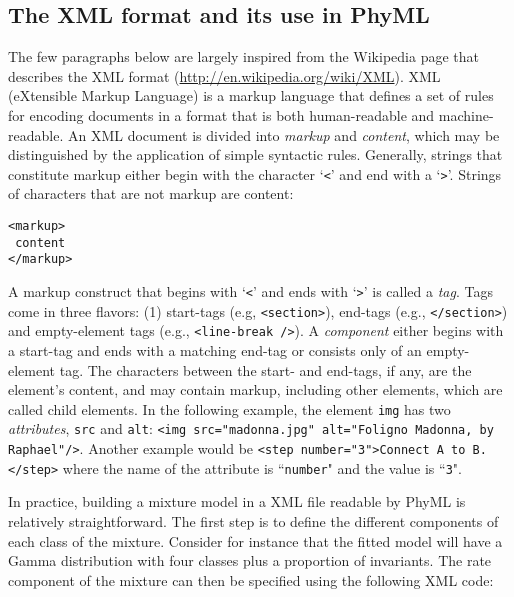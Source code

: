 \documentclass[a4paper,12pt]{article}
\newcommand{\x}[1]{\texttt{#1}}
\begin{document}
\subsection{The XML format and its use in PhyML}\label{sec:XML format}

The few paragraphs below are largely inspired from  the Wikipedia page that describes the XML format
(\url{http://en.wikipedia.org/wiki/XML}). XML (eXtensible Markup Language) is a markup language that
defines  a set  of  rules  for encoding  documents  in  a format  that  is  both human-readable  and
machine-readable.  An  XML document is  divided into  {\em markup} and  {\em content}, which  may be
distinguished  by the  application of  simple syntactic  rules. Generally,  strings that  constitute
markup either begin  with the character `\x{<}' and  end with a `\x{>}'. Strings  of characters that
are not markup are content:

\vspace{0.2cm}
\begin{Verbatim}[frame=single, label=XML markup and content example, samepage=true,
  baselinestretch=0.5, fontsize=\small]
<markup> 
 content 
</markup>
\end{Verbatim}

A markup construct that begins  with `\x{<}' and ends with `\x{>}' is called  a {\em tag}. Tags come
in  three  flavors:  (1)  start-tags  (e.g,  \x{<section>}),  end-tags  (e.g.,  \x{</section>})  and
empty-element tags (e.g., \x{<line-break />}). A {\em  component} either begins with a start-tag and
ends with a  matching end-tag or consists only  of an empty-element tag. The  characters between the
start- and  end-tags, if any,  are the  element's content, and  may contain markup,  including other
elements, which are  called child elements.  In  the following example, the element  \x{img} has two
{\em  attributes},  \x{src}   and  \x{alt}:  \x{<img  src="madonna.jpg"   alt="Foligno  Madonna,  by
Raphael"/>}. Another example would be \x{<step number="3">Connect  A to B.</step>} where the name of
the attribute is ``\x{number}" and the value is ``\x{3}".

In  practice,  building   a  mixture  model  in   a  XML  file  readable  by   PhyML  is  relatively
straightforward.  The first  step  is  to define  the  different components  of  each  class of  the
mixture.  Consider for  instance that  the fitted  model will  have a  Gamma distribution  with four
classes plus  a proportion of invariants.  The rate component of  the mixture can then  be specified
using the following XML code:
\end{document}
